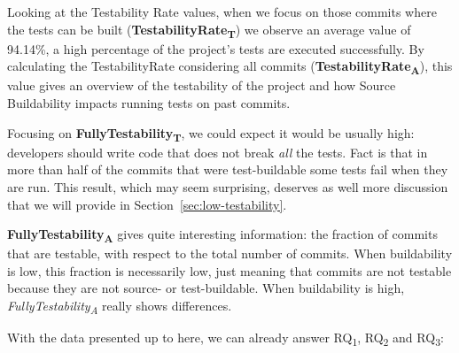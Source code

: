 Looking at the Testability Rate values, when we focus on those commits where the tests can be built (\textbf{TestabilityRate\textsubscript{T}}) we observe an average value of 94.14\%, a high percentage of the project's tests are executed successfully. 
By calculating the TestabilityRate considering all commits (\textbf{TestabilityRate\textsubscript{A}}), this value gives an overview of the testability of the project and how Source Buildability impacts running tests on past commits.

Focusing on \textbf{FullyTestability\textsubscript{T}}, we could expect it would be usually high: developers should write code that does not break \textit{all} the tests. 
Fact is that in more than half of the commits that were test-buildable some tests fail when they are run. 
This result, which may seem surprising, deserves as well more discussion that we will provide in Section~\ref{sec:low-testability}.

\textbf{FullyTestability\textsubscript{A}} gives quite interesting information: the fraction of commits that are testable, with respect to the total number of commits. 
When buildability is low, this fraction is necessarily low, just meaning that commits are not testable because they are not source- or test-buildable. 
When buildability is high, \textit{FullyTestability\textsubscript{A}} really shows differences. 

With the data presented up to here, we can already answer RQ\textsubscript{1}, RQ\textsubscript{2} and RQ\textsubscript{3}:

\vspace{0.5cm}

\vspace{0.5cm}

